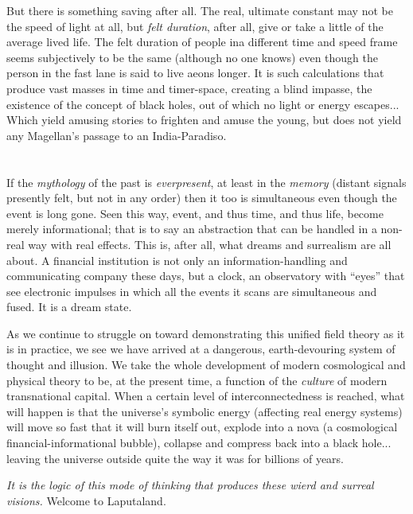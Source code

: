 \documentclass[11pt,twoside,draft]{memoir}
\begin{document}
But there is something saving after all. The
real, ultimate constant may not be the speed
of light at all, but \emph{felt duration}, after all, give
or take a little of the average lived life. The
felt duration of people ina different time and
speed frame seems subjectively to be the
same (although no one knows) even though
the person in the fast lane is said to live
aeons longer. It is such calculations that
produce vast masses in time and timer-space,
creating a blind impasse, the existence of the
concept of black holes, out of which no light
or energy escapes... Which yield amusing
stories to frighten and amuse the young, but
does not yield any Magellan's passage to an
India-Paradiso.

\chapter{}

If the \emph{mythology} of the past is \emph{everpresent},
at least in the \emph{memory} (distant signals presently felt, but not in any order) then it too is
simultaneous even though the event is long
gone. Seen this way, event, and thus time,
and thus life, become merely informational;
that is to say an abstraction that can be
handled in a non-real way with real effects.
This is, after all, what dreams and surrealism
are all about. A financial institution is not
only an information-handling and communicating company these days, but a clock, an
observatory with \enquote{eyes} that see electronic
impulses in which all the events it scans are
simultaneous and fused. It is a dream state.

As we continue to struggle on toward
demonstrating this unified field theory as it
is in practice, we see we have arrived
at a dangerous, earth-devouring system of
thought and illusion. We take the whole
development of modern cosmological and
physical theory to be, at the present time, a
function of the \emph{culture} of modern transnational capital. When a certain level of interconnectedness is reached, what will happen is that the universe's symbolic energy
(affecting real energy systems) will move so
fast that it will burn itself out, explode into a
nova (a cosmological financial-informational
bubble), collapse and compress back into a
black hole... leaving the universe outside
quite the way it was for billions of years.

\emph{It is the logic of this mode of thinking that
produces these wierd and surreal visions.}
Welcome to Laputaland.
\end{document}
